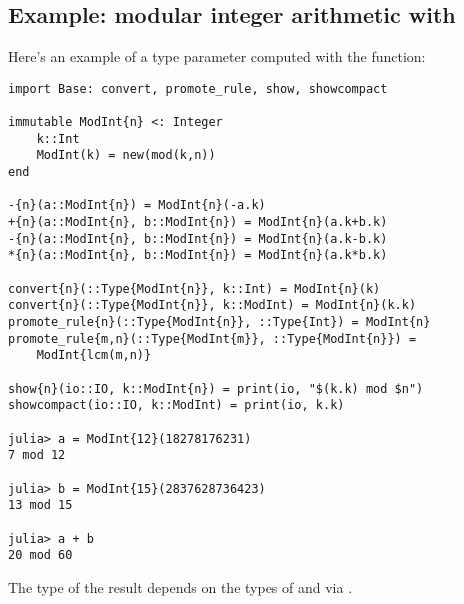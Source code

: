 \subsection{Example: modular integer arithmetic with }

Here's an example of a type parameter computed with the  function:

\begin{verbatim}
import Base: convert, promote_rule, show, showcompact

immutable ModInt{n} <: Integer
    k::Int
    ModInt(k) = new(mod(k,n))
end

-{n}(a::ModInt{n}) = ModInt{n}(-a.k)
+{n}(a::ModInt{n}, b::ModInt{n}) = ModInt{n}(a.k+b.k)
-{n}(a::ModInt{n}, b::ModInt{n}) = ModInt{n}(a.k-b.k)
*{n}(a::ModInt{n}, b::ModInt{n}) = ModInt{n}(a.k*b.k)

convert{n}(::Type{ModInt{n}}, k::Int) = ModInt{n}(k)
convert{n}(::Type{ModInt{n}}, k::ModInt) = ModInt{n}(k.k)
promote_rule{n}(::Type{ModInt{n}}, ::Type{Int}) = ModInt{n}
promote_rule{m,n}(::Type{ModInt{m}}, ::Type{ModInt{n}}) =
    ModInt{lcm(m,n)}

show{n}(io::IO, k::ModInt{n}) = print(io, "$(k.k) mod $n")
showcompact(io::IO, k::ModInt) = print(io, k.k)

julia> a = ModInt{12}(18278176231)
7 mod 12

julia> b = ModInt{15}(2837628736423)
13 mod 15

julia> a + b
20 mod 60
\end{verbatim}

The type of the result  depends on the types of  and  via .
